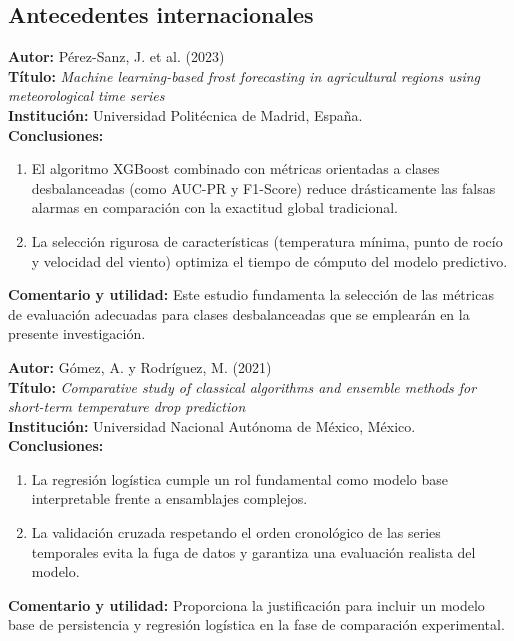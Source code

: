 \subsection{Antecedentes internacionales}

\noindent
\textbf{Autor:} Pérez-Sanz, J. et al. (2023) \\
\textbf{Título:} \textit{Machine learning-based frost forecasting in agricultural regions using meteorological time series} \\
\textbf{Institución:} Universidad Politécnica de Madrid, España. \\
\textbf{Conclusiones:} 
\begin{enumerate}
    \item El algoritmo XGBoost combinado con métricas orientadas a clases desbalanceadas (como AUC-PR y F1-Score) reduce drásticamente las falsas alarmas en comparación con la exactitud global tradicional.
    \item La selección rigurosa de características (temperatura mínima, punto de rocío y velocidad del viento) optimiza el tiempo de cómputo del modelo predictivo.
\end{enumerate}
\noindent\textbf{Comentario y utilidad:} Este estudio fundamenta la selección de las métricas de evaluación adecuadas para clases desbalanceadas que se emplearán en la presente investigación.

\vspace{0.3cm}

\noindent
\textbf{Autor:} Gómez, A. y Rodríguez, M. (2021) \\
\textbf{Título:} \textit{Comparative study of classical algorithms and ensemble methods for short-term temperature drop prediction} \\
\textbf{Institución:} Universidad Nacional Autónoma de México, México. \\
\textbf{Conclusiones:} 
\begin{enumerate}
    \item La regresión logística cumple un rol fundamental como modelo base interpretable frente a ensamblajes complejos.
    \item La validación cruzada respetando el orden cronológico de las series temporales evita la fuga de datos y garantiza una evaluación realista del modelo.
\end{enumerate}
\noindent\textbf{Comentario y utilidad:} Proporciona la justificación para incluir un modelo base de persistencia y regresión logística en la fase de comparación experimental.

